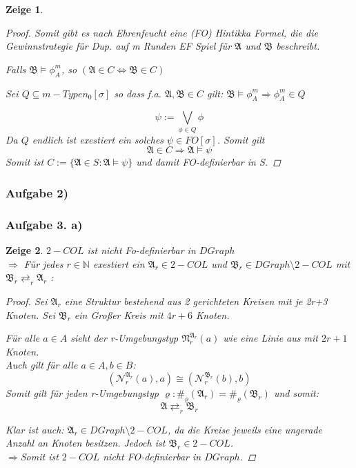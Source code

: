 \documentclass[12pt]{article}
\newtheorem{zeige}{Zeige}
\begin{document}
\begin{zeige}
\begin{proof}
  Somit gibt es nach Ehrenfeucht eine (FO) Hintikka Formel, die die Gewinnstrategie für Dup. auf m Runden EF Spiel für $\mathfrak{A}$ und $\mathfrak{B}$ beschreibt.
  

  \begin{center}
    Falls $\mathfrak{B} \models \phi^m_{A}$, so $(\mathfrak{A}\in C \Leftrightarrow \mathfrak{B}\in C )$
  \end{center}

  Sei $Q\subseteq m-Typen_0[\sigma]$ so dass f.a. $\mathfrak{A},\mathfrak{B}\in C$ gilt: $\mathfrak{B} \models \phi^m_{A} \Rightarrow \phi^m_{A}\in Q$
  
  \[ \psi := \bigvee_{\phi \in Q} \phi \] 
  Da $Q$ endlich ist exestiert ein solches $\psi\in FO[\sigma]$.
  Somit gilt 
  $$ \mathfrak{A}\in C \Rightarrow \mathfrak{A} \models \psi $$
  Somit ist $C:=\{\mathfrak{A}\in S: \mathfrak{A}\models \psi\}$ und damit FO-definierbar in S.

  
  
  
\end{proof}
\end{zeige}

\subsubsection*{Aufgabe 2)}
\subsubsection*{Aufgabe 3. a)}
\begin{zeige}
  $2-COL$ ist nicht Fo-definierbar in $DGraph$\\
  $\Rightarrow$ Für jedes $r\in\mathbb{N}$ exestiert ein $\mathfrak{A}_r \in  2-COL$ und $\mathfrak{B}_r \in DGraph \setminus 2-COL$ mit $\mathfrak{B}_r\rightleftarrows_r \mathfrak{A}_r$ :\\
  
  \begin{proof}
    
    Sei $\mathfrak{A}_r$ eine Struktur bestehend aus 2 gerichteten Kreisen mit je 2r+3 Knoten.
    Sei $\mathfrak{B}_r$ ein Großer Kreis mit $4r+6$ Knoten.

    Für alle $a\in A$ sieht der r-Umgebungstyp $\mathfrak{N}_r^{\mathfrak{A}_r}(a)$ wie eine Linie aus mit $2r+1$ Knoten.\\
    Auch gilt für alle $a\in A, b\in B$: 
    $$(\mathcal{N}_r^{\mathfrak{A}_r}(a),a) \cong (\mathcal{N}_r^{\mathfrak{B}_r}(b),b)$$
    Somit gilt für jeden r-Umgebungstyp $\varrho: \#_\varrho(\mathfrak{A}_r)=\#_\varrho(\mathfrak{B}_r)$ und somit: $$\mathfrak{A}\rightleftarrows_r \mathfrak{B}_r$$
    
    Klar ist auch: $\mathfrak{A}_r\in DGraph\setminus 2-COL$, da die Kreise jeweils eine ungerade Anzahl an Knoten besitzen. Jedoch ist $\mathfrak{B}_r\in 2-COL$.\\
    $\Rightarrow $Somit ist $2-COL$ nicht FO-definierbar in $DGraph$.
  \end{proof}
\end{zeige}
\end{document}
